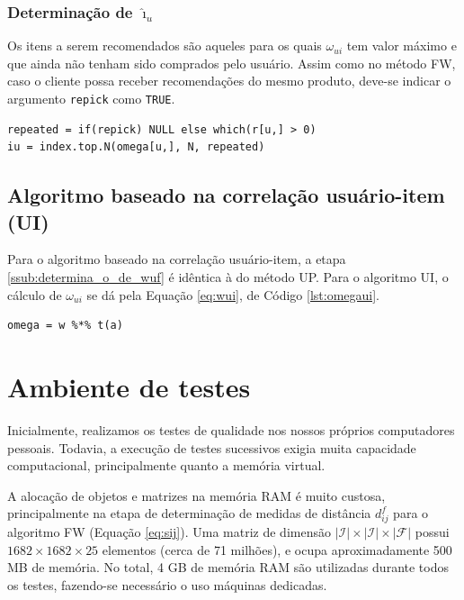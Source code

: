 \subsubsection{Determinação de $\hat{\imath}_u$} %
\label{ssub:determina_o_de_}

Os itens a serem recomendados são aqueles para os quais $\omega_{ui}$ tem valor máximo e que ainda não tenham sido comprados pelo usuário. Assim como no método FW, caso o cliente possa receber recomendações do mesmo produto, deve-se indicar o argumento \texttt{repick} como \texttt{TRUE}.

\begin{lstlisting}[caption=Determinação de $\hat{\imath}_u$]
repeated = if(repick) NULL else which(r[u,] > 0)
iu = index.top.N(omega[u,], N, repeated)
\end{lstlisting}

\subsection{Algoritmo baseado na correlação usuário-item (UI)} %
\label{sub:algoritmo_baseado_na_correla_o_usu_rio_item_ui_}

Para o algoritmo baseado na correlação usuário-item, a etapa \ref{ssub:determina_o_de_wuf} é idêntica à do método UP. Para o algoritmo UI, o cálculo de $\omega_{ui}$ se dá pela Equação \ref{eq:wui}, de Código \ref{lst:omegaui}.

\begin{lstlisting}[caption=Determinação de $\omega_{ui}$,label=lst:omegaui]
omega = w %*% t(a)  
\end{lstlisting}

\section{Ambiente de testes} %
\label{sec:ambiente_de_testes}

Inicialmente, realizamos os testes de qualidade nos nossos próprios computadores pessoais. Todavia, a execução de testes sucessivos exigia muita capacidade computacional, principalmente quanto a memória virtual.

A alocação de objetos e matrizes na memória RAM é muito custosa, principalmente na etapa de determinação de medidas de distância $d_{ij}^f$ para o algoritmo FW (Equação \ref{eq:sij}). Uma matriz de dimensão $\left|\mathcal{I}\right| \times\left|\mathcal{I}\right| \times\left|\mathcal{F}\right|$ possui $1682 \times 1682 \times 25$ elementos (cerca de 71 milhões), e ocupa aproximadamente 500 MB de memória. No total, 4 GB de memória RAM são utilizadas durante todos os testes, fazendo-se necessário o uso máquinas dedicadas.

